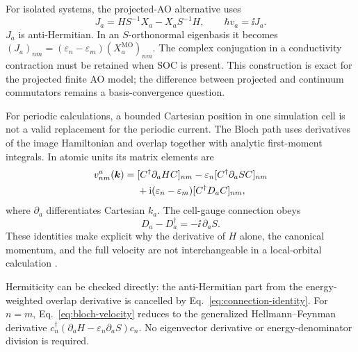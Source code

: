 For isolated systems, the projected-AO alternative uses
\begin{equation}
 J_a=HS^{-1}X_a-X_aS^{-1}H,\qquad
 \hbar v_a=\ii J_a .
 \label{eq:projected-current}
\end{equation}
$J_a$ is anti-Hermitian. In an $S$-orthonormal eigenbasis it becomes
$(J_a)_{nm}=(\varepsilon_n-\varepsilon_m)(X_a^{\mathrm{MO}})_{nm}$.
The complex conjugation in a conductivity contraction must be retained
when SOC is present. This construction is exact for the projected
finite AO model; the difference between projected and continuum
commutators remains a basis-convergence question.

For periodic calculations, a bounded Cartesian position in one
simulation cell is not a valid replacement for the periodic current.
The Bloch path uses derivatives of the image Hamiltonian and overlap
together with analytic first-moment integrals. In atomic units its
matrix elements are
\begin{equation}
 \begin{split}
 v^a_{nm}(\bm{k})={}&
 [C^\dagger\partial_a H C]_{nm}
 -\varepsilon_n[C^\dagger\partial_a S C]_{nm}\\
 &+\mathrm{i}(\varepsilon_n-\varepsilon_m)[C^\dagger D_aC]_{nm},
 \end{split}
 \label{eq:bloch-velocity}
\end{equation}
where $\partial_a$ differentiates Cartesian $k_a$.
The cell-gauge connection obeys
\begin{equation}
 D_a-D_a^\dagger=-\ii\,\partial_a S .
 \label{eq:connection-identity}
\end{equation}
These identities make explicit why the derivative of $H$ alone,
the canonical momentum, and the full velocity are not interchangeable
in a local-orbital calculation
\cite{EsteveParedes2023}.

Hermiticity can be checked directly: the anti-Hermitian part from
the energy-weighted overlap derivative is cancelled by
Eq.~\eqref{eq:connection-identity}.
For $n=m$, Eq.~\eqref{eq:bloch-velocity} reduces to the generalized
Hellmann--Feynman derivative
$c_n^\dagger(\partial_aH-\varepsilon_n\partial_aS)c_n$.
No eigenvector derivative or energy-denominator division is required.

